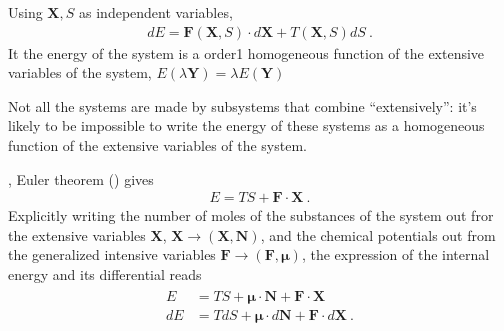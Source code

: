 \documentclass[letterpaper,10pt,english]{jupyterBook}
\begin{document}
\sphinxAtStartPar
Using \(\mathbf{X}, S\) as independent variables,
\begin{equation*}
\begin{split}d E = \mathbf{F}(\mathbf{X}, S) \cdot d \mathbf{X} + T(\mathbf{X}, S) d S \ .\end{split}
\end{equation*}
\sphinxAtStartPar
It the energy of the system is a order\sphinxhyphen{}1 homogeneous function of the extensive variables of the system, \(E(\lambda \mathbf{Y}) = \lambda E(\mathbf{Y})\)%
\begin{footnote}[1]\sphinxAtStartFootnote
Not all the systems are made by sub\sphinxhyphen{}systems that combine “extensively”: it’s likely to be impossible to write the energy of these systems as a homogeneous function of the extensive variables of the system.
%
\end{footnote}, Euler theorem ({\hyperref[\detokenize{ch/potentials:thm-euler}]{}}) gives
\begin{equation*}
\begin{split}E = T S + \mathbf{F} \cdot \mathbf{X} \ .\end{split}
\end{equation*}
\sphinxAtStartPar
Explicitly writing the number of moles of the substances of the system out fror the extensive variables \(\mathbf{X}\), \(\mathbf{X} \rightarrow \left( \mathbf{X}, \mathbf{N} \right)\), and the chemical potentials out from the generalized intensive variables \(\mathbf{F} \rightarrow \left( \mathbf{F}, \boldsymbol\mu \right)\), the expression of the internal energy and its differential reads
\begin{equation*}
\begin{split}\begin{aligned}
   E & = T S + \boldsymbol\mu \cdot \mathbf{N} + \mathbf{F} \cdot \mathbf{X} \\
  dE & = T dS + \boldsymbol\mu \cdot d\mathbf{N} + \mathbf{F} \cdot d\mathbf{X} \ .
\end{aligned}\end{split}
\end{equation*}
\end{document}
